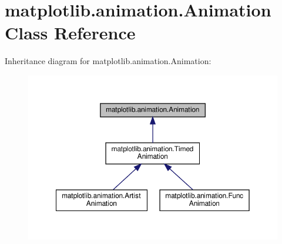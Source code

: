 \hypertarget{classmatplotlib_1_1animation_1_1Animation}{}\section{matplotlib.\+animation.\+Animation Class Reference}
\label{classmatplotlib_1_1animation_1_1Animation}


Inheritance diagram for matplotlib.\+animation.\+Animation\+:
\nopagebreak
\begin{figure}[H]
\begin{center}
\leavevmode
\includegraphics[width=350pt]{classmatplotlib_1_1animation_1_1Animation__inherit__graph}
\end{center}
\end{figure}
